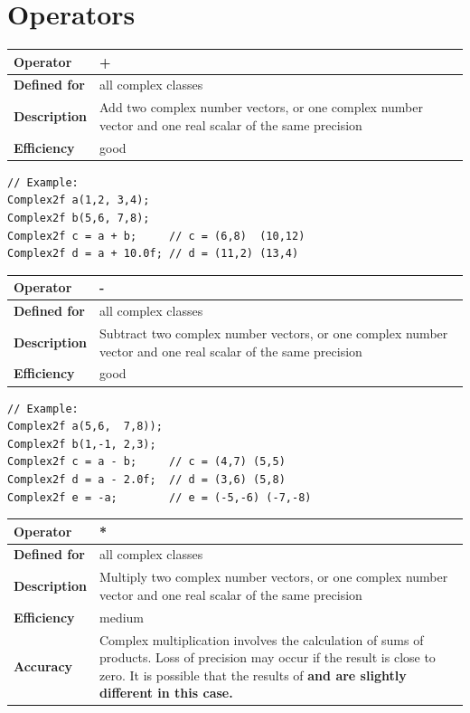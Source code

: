 \documentclass[11pt,a4paper,oneside,openright]{report}
\newcommand{\vspacesmall}{\vspace{3mm}}
\newcommand{\vspacebig}{\vspace{6mm}}
\newcommand{\codei}[1]{\bfseries \ttfamily{#1}\normalfont}
\begin{document}
\chapter{Operators}\label{chap:Operators}

\begin{tabular}{|p{25mm}|p{100mm}|}
\hline
\bfseries Operator & + \\ \hline
\bfseries Defined for & all complex classes  \\ \hline
\bfseries Description & Add two complex number vectors, or one complex number vector and one real scalar of the same precision \\ \hline
\bfseries Efficiency & good \\ \hline
\end{tabular}
\vspacesmall

\begin{lstlisting}[frame=none]
// Example:
Complex2f a(1,2, 3,4);
Complex2f b(5,6, 7,8);
Complex2f c = a + b;     // c = (6,8)  (10,12)
Complex2f d = a + 10.0f; // d = (11,2) (13,4)
\end{lstlisting}
\vspacebig


\begin{tabular}{|p{25mm}|p{100mm}|}
\hline
\bfseries Operator & - \\ \hline
\bfseries Defined for & all complex classes  \\ \hline
\bfseries Description & Subtract two complex number vectors, or one complex number vector and one real scalar of the same precision \\ \hline
\bfseries Efficiency & good \\ \hline
\end{tabular}
\vspacesmall

\begin{lstlisting}[frame=none]
// Example:
Complex2f a(5,6,  7,8));
Complex2f b(1,-1, 2,3);
Complex2f c = a - b;     // c = (4,7) (5,5)
Complex2f d = a - 2.0f;  // d = (3,6) (5,8)
Complex2f e = -a;        // e = (-5,-6) (-7,-8)
\end{lstlisting}
\vspacebig


\begin{tabular}{|p{25mm}|p{100mm}|}
\hline
\bfseries Operator & * \\ \hline
\bfseries Defined for & all complex classes  \\ \hline
\bfseries Description & Multiply two complex number vectors, or one complex number vector and one real scalar of the same precision \\ \hline
\bfseries Efficiency & medium \\ \hline
\bfseries Accuracy & Complex multiplication involves the calculation of sums of products. Loss of precision may occur if the result is close to zero. It is possible that the results of \codei{a * b} and \codei{b * a} are slightly different in this case. \\ \hline
\end{tabular}
\vspacesmall
\end{document}
